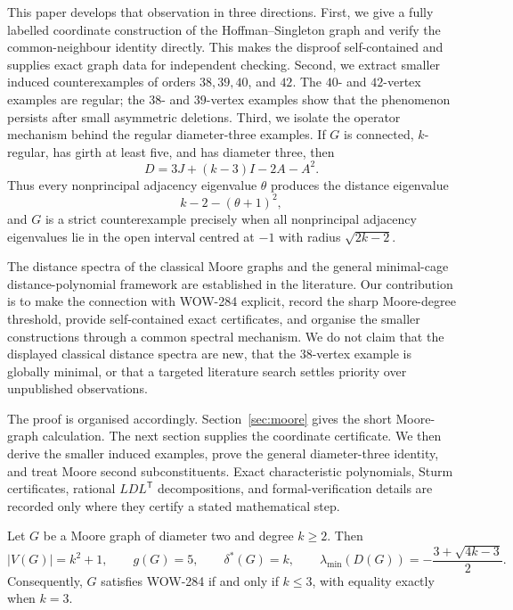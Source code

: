 This paper develops that observation in three directions.  First, we give a
fully labelled coordinate construction of the Hoffman--Singleton graph and
verify the common-neighbour identity directly.  This makes the disproof
self-contained and supplies exact graph data for independent checking.  Second,
we extract smaller induced counterexamples of orders $38,39,40$, and $42$.
The $40$- and $42$-vertex examples are regular; the $38$- and $39$-vertex
examples show that the phenomenon persists after small asymmetric deletions.
Third, we isolate the operator mechanism behind the regular diameter-three
examples.  If $G$ is connected, $k$-regular, has girth at least five, and has
diameter three, then
\[
  D=3J+(k-3)I-2A-A^2.
\]
Thus every nonprincipal adjacency eigenvalue $\theta$ produces the distance
eigenvalue
\[
  k-2-(\theta+1)^2,
\]
and $G$ is a strict counterexample precisely when all nonprincipal adjacency
eigenvalues lie in the open interval centred at $-1$ with radius
$\sqrt{2k-2}$.

The distance spectra of the classical Moore graphs and the general
minimal-cage distance-polynomial framework are established in the literature.
Our contribution is to make the connection with WOW-284 explicit, record the
sharp Moore-degree threshold, provide self-contained exact certificates, and
organise the smaller constructions through a common spectral mechanism.  We do
not claim that the displayed classical distance spectra are new, that the
$38$-vertex example is globally minimal, or that a targeted literature search
settles priority over unpublished observations.

The proof is organised accordingly.  Section~\ref{sec:moore} gives the short
Moore-graph calculation.  The next section supplies the coordinate certificate.
We then derive the smaller induced examples, prove the general diameter-three
identity, and treat Moore second subconstituents.  Exact characteristic
polynomials, Sturm certificates, rational $LDL^{\mathsf T}$ decompositions, and
formal-verification details are recorded only where they certify a stated
mathematical step.

\label{thm:moore-wow-reader-first}
\begin{theoremA}
Let $G$ be a Moore graph of diameter two and degree $k\ge2$.  Then
\[
  |V(G)|=k^2+1,
  \qquad
  g(G)=5,
  \qquad
  \delta^*(G)=k,
  \qquad
  \lambda_{\min}(D(G))=-\frac{3+\sqrt{4k-3}}2.
\]
Consequently, $G$ satisfies WOW-284 if and only if $k\le3$, with equality
exactly when $k=3$.
\end{theoremA}
